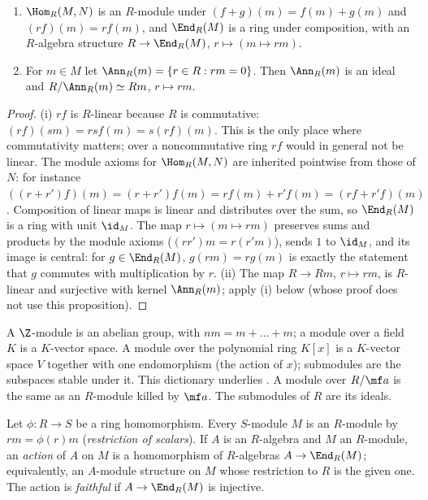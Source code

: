 \begin{proposition}\label{prop:modules:module-basics}
\begin{enumerate}[label=(\roman*)]
\item $\Hom_R(M,N)$ is an $R$-module under $(f+g)(m)=f(m)+g(m)$ and $(rf)(m)=rf(m)$, and $\End_R(M)$ is a ring under
composition, with an $R$-algebra structure $R\to\End_R(M)$, $r\mapsto(m\mapsto rm)$.
\item For $m\in M$ let $\Ann_R(m)=\{r\in R:rm=0\}$. Then $\Ann_R(m)$ is an ideal and $R/\Ann_R(m)\simeq Rm$, $r\mapsto rm$.
\end{enumerate}
\end{proposition}

\begin{proof}
(i) $rf$ is $R$-linear because $R$ is commutative: $(rf)(sm)=rsf(m)=s(rf)(m)$. This is the only place where
commutativity matters; over a noncommutative ring $rf$ would in general not be linear. The module axioms for $\Hom_R(M,N)$ are
inherited pointwise from those of $N$: for instance $((r+r')f)(m)=(r+r')f(m)=rf(m)+r'f(m)=(rf+r'f)(m)$. Composition of linear maps
is linear and distributes over the sum, so $\End_R(M)$ is a ring with unit $\id_M$. The map $r\mapsto(m\mapsto rm)$ preserves sums and
products by the module axioms ($(rr')m=r(r'm)$), sends $1$ to $\id_M$, and its image is central: for $g\in\End_R(M)$,
$g(rm)=rg(m)$ is exactly the statement that $g$ commutes with multiplication by $r$.
(ii) The map $R\to Rm$, $r\mapsto rm$, is $R$-linear and surjective with kernel $\Ann_R(m)$; apply
(i) below (whose proof does not use this proposition).
\end{proof}

\begin{example}\label{ex:modules:module-examples}
A $\Z$-module is an abelian group, with $nm=m+\dots+m$; a module over a field $K$ is a $K$-vector space. A module over
the polynomial ring $K[x]$ is a $K$-vector space $V$ together with one endomorphism (the action of $x$); submodules are
the subspaces stable under it. This dictionary underlies . A module over $R/\mf a$ is the same
as an $R$-module killed by $\mf a$. The submodules of $R$ are its ideals.
\end{example}

\begin{definition}\label{def:modules:algebra-modules}
Let $\phi\colon R\to S$ be a ring homomorphism. Every $S$-module $M$ is an $R$-module by $rm=\phi(r)m$ (\emph{restriction
of scalars}). If $A$ is an $R$-algebra and $M$ an $R$-module, an \emph{action} of $A$ on $M$ is a homomorphism of
$R$-algebras $A\to\End_R(M)$; equivalently, an $A$-module structure on $M$ whose restriction to $R$ is the given one. The
action is \emph{faithful} if $A\to\End_R(M)$ is injective.
\end{definition}

